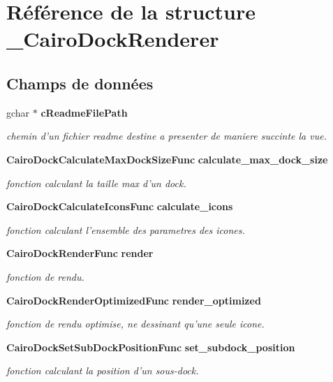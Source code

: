 \section{Référence de la structure \_\-CairoDockRenderer}
\label{struct__CairoDockRenderer}
\subsection*{Champs de données}
\begin{CompactItemize}
\item 
gchar $\ast$ {\bf cReadmeFilePath}
\begin{CompactList}\small\item\em chemin d'un fichier readme destine a presenter de maniere succinte la vue. \item\end{CompactList}\item 
{\bf CairoDockCalculateMaxDockSizeFunc} {\bf calculate\_\-max\_\-dock\_\-size}
\begin{CompactList}\small\item\em fonction calculant la taille max d'un dock. \item\end{CompactList}\item 
{\bf CairoDockCalculateIconsFunc} {\bf calculate\_\-icons}
\begin{CompactList}\small\item\em fonction calculant l'ensemble des parametres des icones. \item\end{CompactList}\item 
{\bf CairoDockRenderFunc} {\bf render}
\begin{CompactList}\small\item\em fonction de rendu. \item\end{CompactList}\item 
{\bf CairoDockRenderOptimizedFunc} {\bf render\_\-optimized}
\begin{CompactList}\small\item\em fonction de rendu optimise, ne dessinant qu'une seule icone. \item\end{CompactList}\item 
{\bf CairoDockSetSubDockPositionFunc} {\bf set\_\-subdock\_\-position}
\begin{CompactList}\small\item\em fonction calculant la position d'un sous-dock. \item\end{CompactList}\item 

\end{CompactItemize}
